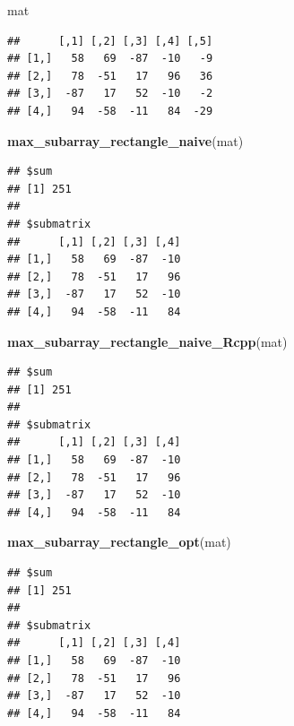 \documentclass[
]{article}
\newenvironment{Shaded}{\begin{snugshade}}{\end{snugshade}}
\newcommand{\FunctionTok}[1]{\textcolor[rgb]{0.13,0.29,0.53}{\textbf{#1}}}
\newcommand{\NormalTok}[1]{#1}
\begin{document}
\begin{Shaded}
\begin{Highlighting}[]
\NormalTok{mat}
\end{Highlighting}
\end{Shaded}

\begin{verbatim}
##      [,1] [,2] [,3] [,4] [,5]
## [1,]   58   69  -87  -10   -9
## [2,]   78  -51   17   96   36
## [3,]  -87   17   52  -10   -2
## [4,]   94  -58  -11   84  -29
\end{verbatim}

\begin{Shaded}
\begin{Highlighting}[]
\FunctionTok{max\_subarray\_rectangle\_naive}\NormalTok{(mat)}
\end{Highlighting}
\end{Shaded}

\begin{verbatim}
## $sum
## [1] 251
## 
## $submatrix
##      [,1] [,2] [,3] [,4]
## [1,]   58   69  -87  -10
## [2,]   78  -51   17   96
## [3,]  -87   17   52  -10
## [4,]   94  -58  -11   84
\end{verbatim}

\begin{Shaded}
\begin{Highlighting}[]
\FunctionTok{max\_subarray\_rectangle\_naive\_Rcpp}\NormalTok{(mat)}
\end{Highlighting}
\end{Shaded}

\begin{verbatim}
## $sum
## [1] 251
## 
## $submatrix
##      [,1] [,2] [,3] [,4]
## [1,]   58   69  -87  -10
## [2,]   78  -51   17   96
## [3,]  -87   17   52  -10
## [4,]   94  -58  -11   84
\end{verbatim}

\begin{Shaded}
\begin{Highlighting}[]
\FunctionTok{max\_subarray\_rectangle\_opt}\NormalTok{(mat)}
\end{Highlighting}
\end{Shaded}

\begin{verbatim}
## $sum
## [1] 251
## 
## $submatrix
##      [,1] [,2] [,3] [,4]
## [1,]   58   69  -87  -10
## [2,]   78  -51   17   96
## [3,]  -87   17   52  -10
## [4,]   94  -58  -11   84
\end{verbatim}
\end{document}
